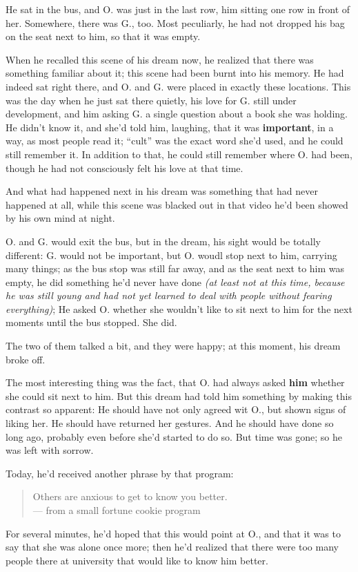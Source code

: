 He sat in the bus, and O. was just in the last row, him sitting one row in front of her. Somewhere, there was G., too. Most peculiarly, he had not dropped his bag on the seat next to him, so that it was empty.

When he recalled this scene of his dream now, he realized that there was something familiar about it; this scene had been burnt into his memory. He had indeed sat right there, and O. and G. were placed in exactly these locations. This was the day when he just sat there quietly, his love for G. still under development, and him asking G. a single question about a book she was holding. He didn't know it, and she'd told him, laughing, that it was \textbf{important}, in a way, as most people read it; \enquote{cult} was the exact word she'd used, and he could still remember it. In addition to that, he could still remember where O. had been, though he had not consciously felt his love at that time.

And what had happened next in his dream was something that had never happened at all, while this scene was blacked out in that video he'd been showed by his own mind at night.

O. and G. would exit the bus, but in the dream, his sight would be totally different: G. would not be important, but O. woudl stop next to him, carrying many things; as the bus stop was still far away, and as the seat next to him was empty, he did something he'd never have done \emph{(at least not at this time, because he was still young and had not yet learned to deal with people without fearing everything)}; He asked O. whether she wouldn't like to sit next to him for the next moments until the bus stopped.
She did.

The two of them talked a bit, and they were happy; at this moment, his dream broke off.

The most interesting thing was the fact, that O. had always asked \textbf{him} whether she could sit next to him. But this dream had told him something by making this contrast so apparent: He should have not only agreed wit O., but shown signs of liking her. He should have returned her gestures. And he should have done so long ago, probably even before she'd started to do so. 
But time was gone; so he was left with sorrow.

Today, he'd received another phrase by that program: 
\begin{quote}
Others are anxious to get to know you better. \\
--- from a small fortune cookie program
\end{quote}
For several minutes, he'd hoped that this would point at O., and that it was to say that she was alone once more; then he'd realized that there were too many people there at university that would like to know him better.

